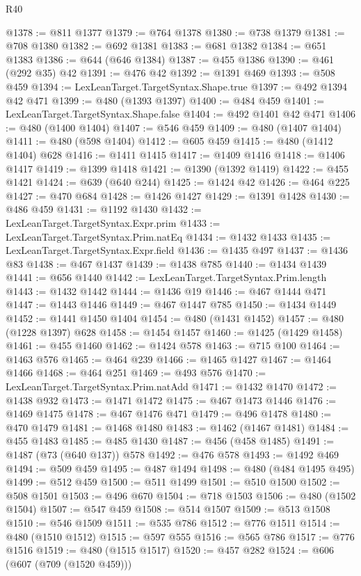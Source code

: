 \begin{lexlean}{R40}
\begin{coremodule}
@1378 := @811 @1377
@1379 := @764 @1378
@1380 := @738 @1379
@1381 := @708 @1380
@1382 := @692 @1381
@1383 := @681 @1382
@1384 := @651 @1383
@1386 := @644 (@646 @1384)
@1387 := @455 @1386
@1390 := @461 (@292 @35) @42
@1391 := @476 @42
@1392 := @1391 @469
@1393 := @508 @459
@1394 := LexLeanTarget.TargetSyntax.Shape.true
@1397 := @492 @1394 @42 @471
@1399 := @480 (@1393 @1397)
@1400 := @484 @459
@1401 := LexLeanTarget.TargetSyntax.Shape.false
@1404 := @492 @1401 @42 @471
@1406 := @480 (@1400 @1404)
@1407 := @546 @459
@1409 := @480 (@1407 @1404)
@1411 := @480 (@598 @1404)
@1412 := @605 @459
@1415 := @480 (@1412 @1404) @628
@1416 := @1411 @1415
@1417 := @1409 @1416
@1418 := @1406 @1417
@1419 := @1399 @1418
@1421 := @1390 (@1392 @1419)
@1422 := @455 @1421
@1424 := @639 (@640 @244)
@1425 := @1424 @42
@1426 := @464 @225
@1427 := @470 @684
@1428 := @1426 @1427
@1429 := @1391 @1428
@1430 := @486 @459
@1431 := @1192 @1430
@1432 := LexLeanTarget.TargetSyntax.Expr.prim
@1433 := LexLeanTarget.TargetSyntax.Prim.natEq
@1434 := @1432 @1433
@1435 := LexLeanTarget.TargetSyntax.Expr.field
@1436 := @1435 @497
@1437 := @1436 @83
@1438 := @467 @1437
@1439 := @1438 @785
@1440 := @1434 @1439
@1441 := @656 @1440
@1442 := LexLeanTarget.TargetSyntax.Prim.length
@1443 := @1432 @1442
@1444 := @1436 @19
@1446 := @467 @1444 @471
@1447 := @1443 @1446
@1449 := @467 @1447 @785
@1450 := @1434 @1449
@1452 := @1441 @1450 @1404
@1454 := @480 (@1431 @1452)
@1457 := @480 (@1228 @1397) @628
@1458 := @1454 @1457
@1460 := @1425 (@1429 @1458)
@1461 := @455 @1460
@1462 := @1424 @578
@1463 := @715 @100
@1464 := @1463 @576
@1465 := @464 @239
@1466 := @1465 @1427
@1467 := @1464 @1466
@1468 := @464 @251
@1469 := @493 @576
@1470 := LexLeanTarget.TargetSyntax.Prim.natAdd
@1471 := @1432 @1470
@1472 := @1438 @932
@1473 := @1471 @1472
@1475 := @467 @1473 @1446
@1476 := @1469 @1475
@1478 := @467 @1476 @471
@1479 := @496 @1478
@1480 := @470 @1479
@1481 := @1468 @1480
@1483 := @1462 (@1467 @1481)
@1484 := @455 @1483
@1485 := @485 @1430
@1487 := @456 (@458 @1485)
@1491 := @1487 (@73 (@640 @137)) @578
@1492 := @476 @578
@1493 := @1492 @469
@1494 := @509 @459
@1495 := @487 @1494
@1498 := @480 (@484 @1495 @495)
@1499 := @512 @459
@1500 := @511 @1499
@1501 := @510 @1500
@1502 := @508 @1501
@1503 := @496 @670
@1504 := @718 @1503
@1506 := @480 (@1502 @1504)
@1507 := @547 @459
@1508 := @514 @1507
@1509 := @513 @1508
@1510 := @546 @1509
@1511 := @535 @786
@1512 := @776 @1511
@1514 := @480 (@1510 @1512)
@1515 := @597 @555
@1516 := @565 @786
@1517 := @776 @1516
@1519 := @480 (@1515 @1517)
@1520 := @457 @282
@1524 := @606 (@607 (@709 (@1520 @459)))

\end{coremodule}
\end{lexlean}
